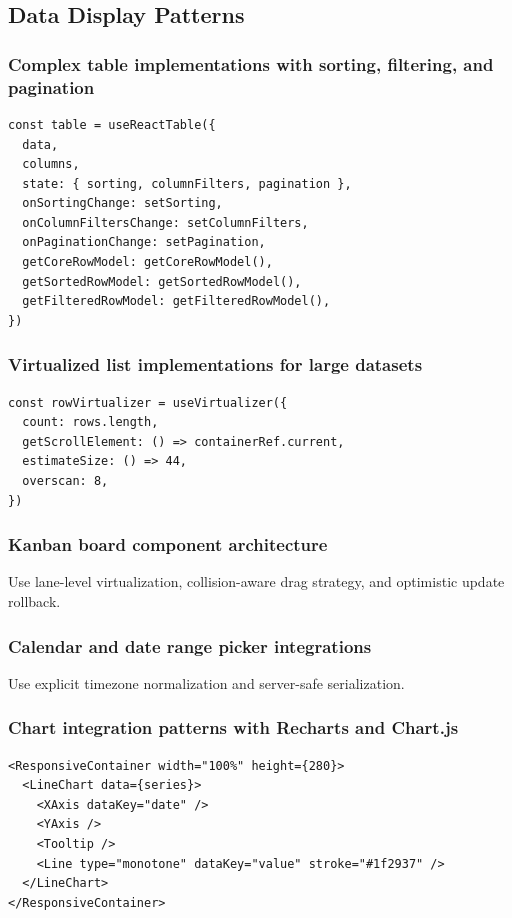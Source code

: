 \subsection{Data Display Patterns}

\subsubsection{Complex table implementations with sorting, filtering, and pagination}
\begin{verbatim}
const table = useReactTable({
  data,
  columns,
  state: { sorting, columnFilters, pagination },
  onSortingChange: setSorting,
  onColumnFiltersChange: setColumnFilters,
  onPaginationChange: setPagination,
  getCoreRowModel: getCoreRowModel(),
  getSortedRowModel: getSortedRowModel(),
  getFilteredRowModel: getFilteredRowModel(),
})
\end{verbatim}

\subsubsection{Virtualized list implementations for large datasets}
\begin{verbatim}
const rowVirtualizer = useVirtualizer({
  count: rows.length,
  getScrollElement: () => containerRef.current,
  estimateSize: () => 44,
  overscan: 8,
})
\end{verbatim}

\subsubsection{Kanban board component architecture}
Use lane-level virtualization, collision-aware drag strategy, and optimistic update rollback.

\subsubsection{Calendar and date range picker integrations}
Use explicit timezone normalization and server-safe serialization.

\subsubsection{Chart integration patterns with Recharts and Chart.js}
\begin{verbatim}
<ResponsiveContainer width="100%" height={280}>
  <LineChart data={series}>
    <XAxis dataKey="date" />
    <YAxis />
    <Tooltip />
    <Line type="monotone" dataKey="value" stroke="#1f2937" />
  </LineChart>
</ResponsiveContainer>
\end{verbatim}

